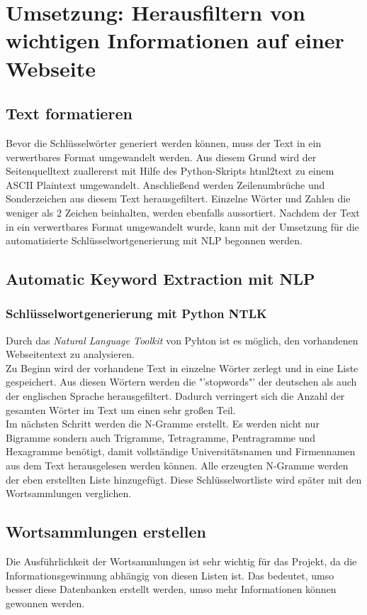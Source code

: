 \section{Umsetzung: Herausfiltern von wichtigen Informationen auf einer Webseite}
	\subsection{Text formatieren}
	\label{subsec:TextFormatieren}
	Bevor die Schlüsselwörter generiert werden können, muss der Text in ein verwertbares Format umgewandelt werden. Aus diesem Grund wird der Seitenquelltext zuallererst mit Hilfe des Python-Skripts html2text zu einem ASCII Plaintext umgewandelt.\cite{html2text} Anschließend werden Zeilenumbrüche und Sonderzeichen aus diesem Text herausgefiltert. Einzelne Wörter und Zahlen die weniger als 2 Zeichen beinhalten, werden ebenfalls aussortiert. Nachdem der Text in ein verwertbares Format umgewandelt wurde, kann mit der Umsetzung für die automatisierte Schlüsselwortgenerierung mit NLP begonnen werden.
	\subsection{Automatic Keyword Extraction mit NLP}
	\subsubsection{Schlüsselwortgenerierung mit Python NTLK}
	Durch das \textit{Natural Language Toolkit} von Pyhton ist es möglich, den vorhandenen Webseitentext zu analysieren.\\
	Zu Beginn wird der vorhandene Text in einzelne Wörter zerlegt und in eine Liste gespeichert. Aus diesen Wörtern werden die "'stopwords"' der deutschen als auch der englischen Sprache herausgefiltert. Dadurch verringert sich die Anzahl der gesamten Wörter im Text um einen sehr großen Teil. \\
	Im nächsten Schritt werden die N-Gramme erstellt. Es werden nicht nur Bigramme sondern auch Trigramme, Tetragramme, Pentragramme und Hexagramme benötigt, damit vollständige Universitätsnamen und Firmennamen aus dem Text herausgelesen werden können. Alle erzeugten N-Gramme werden der eben erstellten Liste hinzugefügt. Diese Schlüsselwortliste wird später mit den Wortsammlungen verglichen.\\
	
	\subsection{Wortsammlungen erstellen}
	Die Ausführlichkeit der Wortsammlungen ist sehr wichtig für das Projekt, da die Informationsgewinnung abhängig von diesen Listen ist. Das bedeutet, umso besser diese Datenbanken erstellt werden, umso mehr Informationen können gewonnen werden.
	
